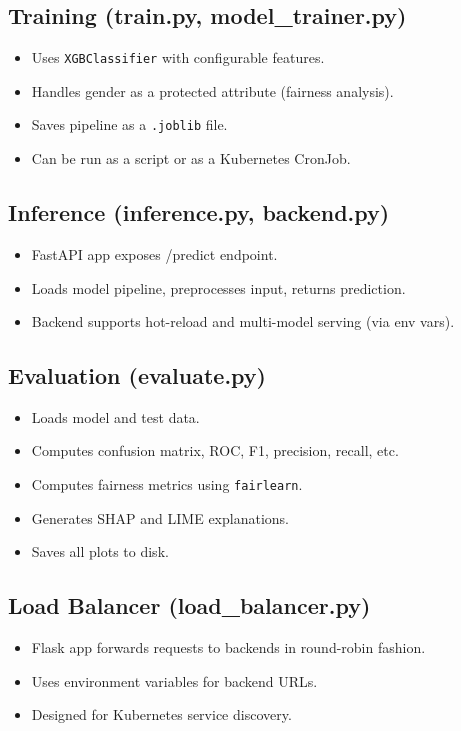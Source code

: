 \documentclass[11pt]{article}
\begin{document}
\subsection{Training (train.py, model_trainer.py)}
\begin{itemize}
  \item Uses \texttt{XGBClassifier} with configurable features.
  \item Handles gender as a protected attribute (fairness analysis).
  \item Saves pipeline as a \texttt{.joblib} file.
  \item Can be run as a script or as a Kubernetes CronJob.
\end{itemize}

\subsection{Inference (inference.py, backend.py)}
\begin{itemize}
  \item FastAPI app exposes /predict endpoint.
  \item Loads model pipeline, preprocesses input, returns prediction.
  \item Backend supports hot-reload and multi-model serving (via env vars).
\end{itemize}

\subsection{Evaluation (evaluate.py)}
\begin{itemize}
  \item Loads model and test data.
  \item Computes confusion matrix, ROC, F1, precision, recall, etc.
  \item Computes fairness metrics using \texttt{fairlearn}.
  \item Generates SHAP and LIME explanations.
  \item Saves all plots to disk.
\end{itemize}

\subsection{Load Balancer (load_balancer.py)}
\begin{itemize}
  \item Flask app forwards requests to backends in round-robin fashion.
  \item Uses environment variables for backend URLs.
  \item Designed for Kubernetes service discovery.
\end{itemize}
\end{document}

